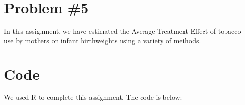 \documentclass[letterpaper, 12pt]{article}
\begin{document}
\section{Problem \#5}
In this assignment, we have estimated the Average Treatment Effect of tobacco use by mothers on infant birthweights using a variety of methods. 

\section{Code}
We used R to complete this assignment.  The code is below:




\newpage
\thispagestyle{empty}
\mbox{}
\end{document}
